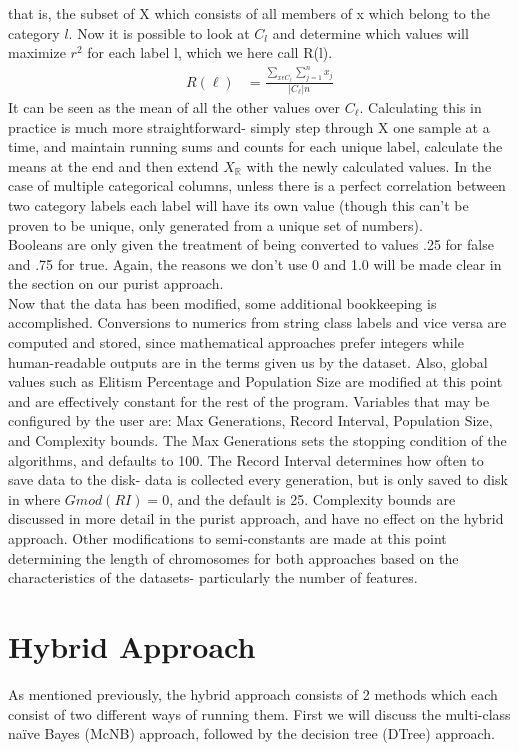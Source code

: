 that is, the subset of X which consists of all members of x which belong to the
category $l$. Now it is possible to look at $C_l$ and determine which values
will maximize $r^2$ for each label l, which we here call R(l).
\begin{align}
	R(\ell) &= \frac{\sum_{x\epsilon C_\ell}\sum_{j=1}^{n}x_j}{|C_\ell|n}
\end{align} 
It can be seen as the mean of all the other values over $C_\ell$.  Calculating this
in practice is much more straightforward- simply step through X one sample at a
time, and maintain running sums and counts for each unique label, calculate the
means at the end and then extend $X_\mathbb{R}$ with the newly calculated
values.  In the case of multiple categorical columns, unless there is a perfect
correlation between two category labels each label will have its own value
(though this can't be proven to be unique, only generated from a unique set of
numbers).\\
Booleans are only given the treatment of being converted to values .25 for false
and .75 for true.  Again, the reasons we don't use 0 and 1.0 will be made clear
in the section on our purist approach.\\
Now that the data has been modified, some additional bookkeeping is
accomplished.  Conversions to numerics from string class labels and vice versa
are computed and stored, since mathematical approaches prefer integers while
human-readable outputs are in the terms given us by the dataset.  Also, global
values such as Elitism Percentage and Population Size are modified at this point
and are effectively constant for the rest of the program.  Variables that may be
configured by the user are: Max Generations, Record Interval, Population Size,
and Complexity bounds.  The Max Generations sets the stopping condition of the
algorithms, and defaults to 100.  The Record Interval determines how often to
save data to the disk- data is collected every generation, but is only saved to
disk in where $G mod(RI) = 0$, and the default is 25.  Complexity bounds are
discussed in more detail in the purist approach, and have no effect on the
hybrid approach.  Other modifications to semi-constants are made at this point
determining the length of chromosomes for both approaches based on the
characteristics of the datasets- particularly the number of features.
\section{Hybrid Approach}
As mentioned previously, the hybrid approach consists of 2 methods which each
consist of two different ways of running them.  First we will discuss the
multi-class na\"ive Bayes (McNB) approach, followed by the decision tree (DTree)
approach.
